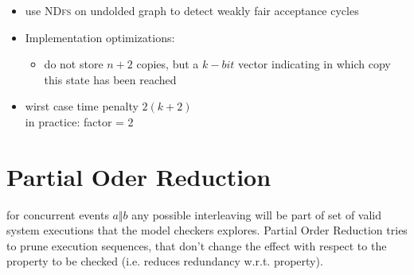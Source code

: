\documentclass[a4paper, 10pt]{article}
\begin{document}
\begin{itemize}
\begin{itemize}
    \end{itemize}
    \item use \textsc{NDfs} on undolded graph to detect weakly fair acceptance cycles
    \item Implementation optimizations:
    \begin{itemize}
        \item do not store $n+2$ copies, but a $k-bit$ vector indicating in which copy this state has been reached
    \end{itemize}
    \item wirst case time penalty $2(k+2)$
    \\ in practice: factor = 2
\end{itemize}

\section*{Partial Oder Reduction}
for concurrent events $a \Vert b$ any possible interleaving will be part of set of valid system executions that the model checkers explores. Partial Order Reduction tries to prune execution sequences, that don't change the effect with respect to the property to be checked (i.e. reduces redundancy w.r.t. property).

\end{document}
